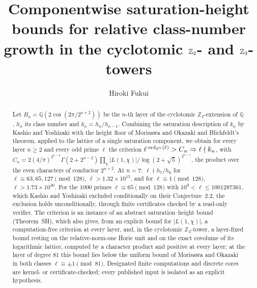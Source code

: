 \documentclass[11pt]{amsart}
\title[Componentwise saturation-height bounds]{Componentwise saturation-height bounds for relative class-number growth in the cyclotomic $\Z_2$- and $\Z_3$-towers}
\author{Hiroki Fukui}
\theoremstyle{remark}\newtheorem{remark}[theorem]{Remark}
\theoremstyle{definition}\newtheorem{definition}[theorem]{Definition}
\newcommand{\Q}{\mathbb{Q}}\newcommand{\Z}{\mathbb{Z}}\newcommand{\R}{\mathbb{R}}\newcommand{\F}{\mathbb{F}}
\begin{document}
\begin{abstract}
Let $B_n=\Q(2\cos(2\pi/2^{n+2}))$ be the $n$-th layer of the cyclotomic $\Z_2$-extension of $\Q$, $h_n$ its class number and $k_n=h_n/h_{n-1}$. Combining the saturation description of $k_n$ by Kashio and Yoshizaki with the height floor of Morisawa and Okazaki and Blichfeldt's theorem, applied to the lattice of a single saturation component, we obtain for every layer $n\ge2$ and every odd prime $\ell$ the criterion $\ell^{\,\operatorname{ord}_{2^n}(\ell)}>C_n\Rightarrow\ell\nmid k_n$, with $C_n=2(4/\pi)^{2^{n-2}}\Gamma(2+2^{n-2})\prod_{\chi}|L(1,\chi)|/\log(2+\sqrt5)^{2^{n-1}}$, the product over the even characters of conductor $2^{n+2}$. At $n=7$: $\ell\nmid h_7/h_6$ for $\ell\equiv63,65,127\pmod{128}$, $\ell>1.32\times10^{15}$, and for $\ell\equiv1\pmod{128}$, $\ell>1.73\times10^{30}$. For the $1000$ primes $\ell\equiv65\pmod{128}$ with $10^9<\ell\le1001287361$, which Kashio and Yoshizaki excluded conditionally on their Conjecture~2.2, the exclusion holds unconditionally, through finite certificates checked by a read-only verifier. The criterion is an instance of an abstract saturation--height bound (Theorem~SH), which also gives, from an explicit bound for $|L(1,\chi)|$, a computation-free criterion at every layer, and, in the cyclotomic $\Z_3$-tower, a layer-fixed bound resting on the relative-norm-one Horie unit and on the exact covolume of its logarithmic lattice, computed by a character product and positive at every layer; at the layer of degree $81$ this bound lies below the uniform bound of Morisawa and Okazaki in both classes $\ell\equiv\pm1\pmod{81}$. Designated finite computations and discrete cores are kernel- or certificate-checked; every published input is isolated as an explicit hypothesis.
\end{abstract}
\maketitle
\end{document}
